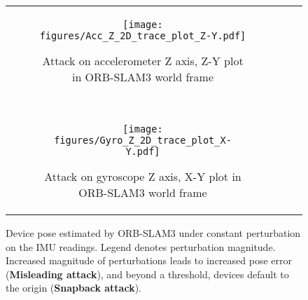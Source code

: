 \begin{figure*}[h]
\begin{tabular}{ccc}
        \begin{subfigure}[b]{0.32\textwidth}
            \centering
            \texttt{[image: figures/Acc\_Z\_2D\_trace\_plot\_Z-Y.pdf]}
            \caption{Attack on accelerometer Z axis, Z-Y plot in ORB-SLAM3 world frame}
            \label{subfig:orbslam_acc_constant_6}
        \end{subfigure}
        ~
        \begin{subfigure}[b]{0.32\textwidth}
            \centering
            \texttt{[image: figures/Gyro\_Z\_2D\_trace\_plot\_X-Y.pdf]}
            \caption{Attack on gyroscope Z axis, X-Y plot in ORB-SLAM3 world frame}
            \label{subfig:orbslam_gyro_constant_3}
        \end{subfigure} \\
    \end{tabular}
    \caption{
    Device pose estimated by ORB-SLAM3 under constant perturbation on the IMU readings.
    Legend denotes perturbation magnitude.
    Increased magnitude of perturbations leads to increased pose error (\textbf{Misleading attack}), and beyond a threshold, devices default to the origin (\textbf{Snapback attack}).
    }
    \label{fig:orbslam_acc_constant}
\end{figure*}


